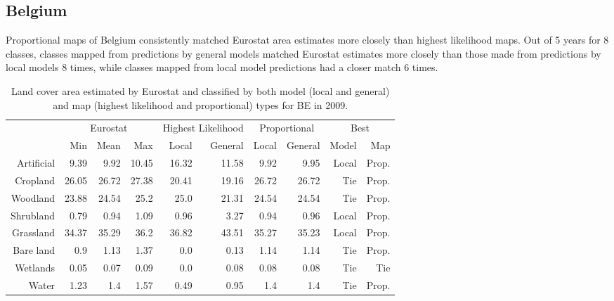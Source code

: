 \subsection{Belgium}
Proportional maps of Belgium consistently matched Eurostat area estimates more closely than highest likelihood maps. Out of 5 years for 8 classes, classes mapped from predictions by general models matched Eurostat estimates more closely than those made from predictions by local models 8 times, while classes mapped from local model predictions had a closer match 6 times.
\begin{table}[H]
\centering
\caption{Land cover area estimated by Eurostat and classified by both model (local and general) and map (highest likelihood and proportional) types for BE in 2009.}

\begin{tabular}{r|rrr|rr|rr|rr}
\toprule
{} & \multicolumn{3}{|c}{Eurostat} & \multicolumn{2}{|c}{Highest Likelihood} & \multicolumn{2}{|c}{Proportional} & \multicolumn{2}{|c}{Best} \\
{} &      Min &   Mean &    Max &              Local & General &        Local & General &  Model &    Map \\
\midrule
Artificial &     9.39 &   9.92 &  10.45 &              16.32 &   11.58 &         9.92 &    9.95 &  Local &  Prop. \\
Cropland   &    26.05 &  26.72 &  27.38 &              20.41 &   19.16 &        26.72 &   26.72 &    Tie &  Prop. \\
Woodland   &    23.88 &  24.54 &   25.2 &               25.0 &   21.31 &        24.54 &   24.54 &    Tie &  Prop. \\
Shrubland  &     0.79 &   0.94 &   1.09 &               0.96 &    3.27 &         0.94 &    0.96 &  Local &  Prop. \\
Grassland  &    34.37 &  35.29 &   36.2 &              36.82 &   43.51 &        35.27 &   35.23 &  Local &  Prop. \\
Bare land  &      0.9 &   1.13 &   1.37 &                0.0 &    0.13 &         1.14 &    1.14 &    Tie &  Prop. \\
Wetlands   &     0.05 &   0.07 &   0.09 &                0.0 &    0.08 &         0.08 &    0.08 &    Tie &    Tie \\
Water      &     1.23 &    1.4 &   1.57 &               0.49 &    0.95 &          1.4 &     1.4 &    Tie &  Prop. \\
\bottomrule
\end{tabular}
\end{table}

